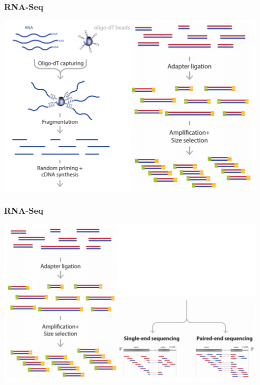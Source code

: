 \documentclass{beamer}			  %
\begin{document}
\begin{frame}
	\frametitle{RNA-Seq}
	\begin{center}
		\includegraphics[height=0.8\textheight]{figures/dge_01ap.png}
	\end{center}
\end{frame}

\begin{frame}
	\frametitle{RNA-Seq}
	\begin{center}
		\includegraphics[height=0.8\textheight]{figures/dge_01bp.png}
	\end{center}
\end{frame}
\end{document}
